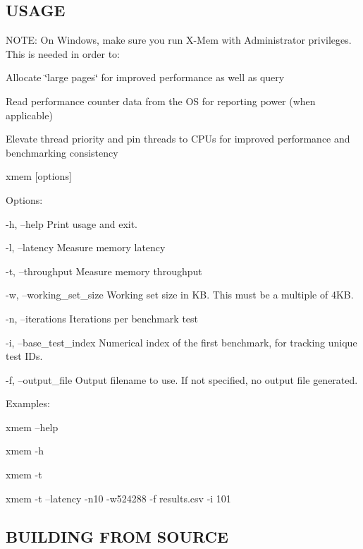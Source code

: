  \subsection*{U\+S\+A\+G\+E }

N\+O\+T\+E\+: On Windows, make sure you run X-\/\+Mem with Administrator privileges. This is needed in order to\+:
\begin{DoxyItemize}
\item Allocate \char`\"{}large pages\char`\"{} for improved performance as well as query
\item Read performance counter data from the O\+S for reporting power (when applicable)
\item Elevate thread priority and pin threads to C\+P\+Us for improved performance and benchmarking consistency
\end{DoxyItemize}

xmem \mbox{[}options\mbox{]}

Options\+: \begin{DoxyVerb}-h, --help                Print usage and exit.

-l, --latency             Measure memory latency

-t, --throughput          Measure memory throughput

-w, --working_set_size    Working set size in KB. This must be a multiple of
                          4KB.

-n, --iterations          Iterations per benchmark test

-i, --base_test_index     Numerical index of the first benchmark, for
                          tracking unique test IDs.

-f, --output_file         Output filename to use. If not specified, no
                          output file generated.
\end{DoxyVerb}


Examples\+: \begin{DoxyVerb}xmem --help

xmem -h

xmem -t

xmem -t --latency -n10 -w524288 -f results.csv -i 101
\end{DoxyVerb}




 \subsection*{B\+U\+I\+L\+D\+I\+N\+G F\+R\+O\+M S\+O\+U\+R\+C\+E }

